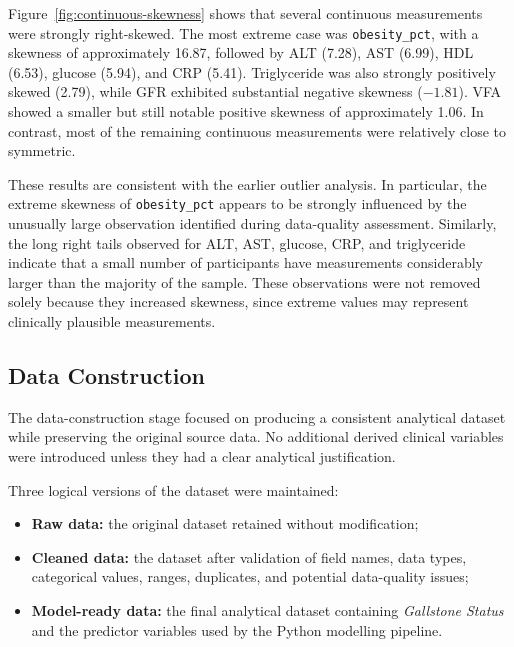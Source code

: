 Figure~\ref{fig:continuous-skewness} shows that several continuous measurements
were strongly right-skewed. The most extreme case was
\texttt{obesity\_pct}, with a skewness of approximately 16.87, followed by
ALT (7.28), AST (6.99), HDL (6.53), glucose (5.94), and CRP (5.41).
Triglyceride was also strongly positively skewed (2.79), while GFR exhibited
substantial negative skewness ($-1.81$). VFA showed a smaller but still notable
positive skewness of approximately 1.06. In contrast, most of the remaining
continuous measurements were relatively close to symmetric.

These results are consistent with the earlier outlier analysis. In particular,
the extreme skewness of \texttt{obesity\_pct} appears to be strongly influenced
by the unusually large observation identified during data-quality assessment.
Similarly, the long right tails observed for ALT, AST, glucose, CRP, and
triglyceride indicate that a small number of participants have measurements
considerably larger than the majority of the sample. These observations were
not removed solely because they increased skewness, since extreme values may
represent clinically plausible measurements.


\subsection{Data Construction}
\label{subsec:data-construction}

The data-construction stage focused on producing a consistent analytical dataset
while preserving the original source data. No additional derived clinical
variables were introduced unless they had a clear analytical justification.

Three logical versions of the dataset were maintained:

\begin{itemize}
    \item \textbf{Raw data:} the original dataset retained without
          modification;

    \item \textbf{Cleaned data:} the dataset after validation of field names,
          data types, categorical values, ranges, duplicates, and potential
          data-quality issues;

    \item \textbf{Model-ready data:} the final analytical dataset containing
          \textit{Gallstone Status} and the predictor variables used by the
          Python modelling pipeline.
\end{itemize}


